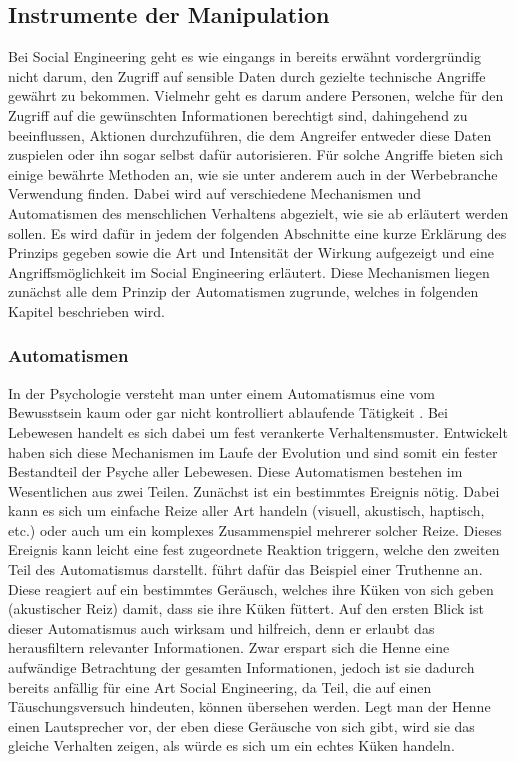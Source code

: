 \subsection{Instrumente der Manipulation}\label{sec:instrumente_der_manipulation}

Bei Social Engineering geht es wie eingangs in  bereits erwähnt vordergründig nicht darum, den Zugriff auf sensible Daten durch gezielte technische Angriffe gewährt zu bekommen.
Vielmehr geht es darum andere Personen, welche für den Zugriff auf die gewünschten Informationen berechtigt sind, dahingehend zu beeinflussen, Aktionen durchzuführen, die dem Angreifer entweder diese Daten zuspielen oder ihn sogar selbst dafür autorisieren.
Für solche Angriffe bieten sich einige bewährte Methoden an, wie sie unter anderem auch in der Werbebranche
Verwendung finden.
Dabei wird auf verschiedene Mechanismen und Automatismen des menschlichen Verhaltens abgezielt, wie sie ab  erläutert werden sollen.
Es wird dafür in jedem der folgenden Abschnitte eine kurze Erklärung des Prinzips gegeben sowie die Art und
Intensität der Wirkung aufgezeigt und eine Angriffsmöglichkeit im Social Engineering erläutert.
Diese Mechanismen liegen zunächst alle dem Prinzip der Automatismen zugrunde, welches in folgenden Kapitel beschrieben wird.

\subsubsection{Automatismen}\label{sec:automatismen}
In der Psychologie versteht man unter einem Automatismus eine vom Bewusstsein kaum oder gar nicht kontrolliert ablaufende Tätigkeit \citep{duden}.
Bei Lebewesen handelt es sich dabei um fest verankerte Verhaltensmuster.
Entwickelt haben sich diese Mechanismen im Laufe der Evolution und sind somit ein fester Bestandteil der Psyche aller Lebewesen.
Diese Automatismen bestehen im Wesentlichen aus zwei Teilen.
Zunächst ist ein bestimmtes Ereignis nötig.
Dabei kann es sich um einfache Reize aller Art handeln (visuell, akustisch, haptisch, etc.) oder auch um ein komplexes Zusammenspiel mehrerer solcher Reize.
Dieses Ereignis kann leicht eine fest zugeordnete Reaktion triggern, welche den zweiten Teil des Automatismus darstellt.
\citep{cialdini} führt dafür das Beispiel einer Truthenne an.
Diese reagiert auf ein bestimmtes Geräusch, welches ihre Küken von sich geben (akustischer Reiz) damit, dass sie ihre Küken füttert.
Auf den ersten Blick ist dieser Automatismus auch wirksam und hilfreich, denn er erlaubt das herausfiltern relevanter Informationen.
Zwar erspart sich die Henne eine aufwändige Betrachtung der gesamten Informationen, jedoch ist sie dadurch bereits anfällig für eine Art Social Engineering, da Teil, die auf einen Täuschungsversuch hindeuten, können übersehen werden.
Legt man der Henne einen Lautsprecher vor, der eben diese Geräusche von sich gibt, wird sie das gleiche Verhalten zeigen, als würde es sich um ein echtes Küken handeln.

